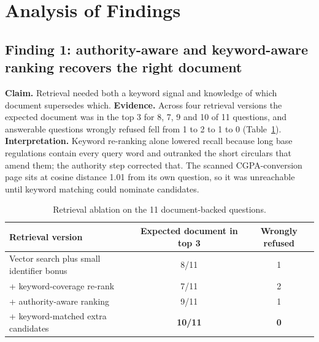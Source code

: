 \documentclass[10pt,a4paper]{article}
\begin{document}
\section{Analysis of Findings}\label{sec:analysis}
\subsection*{Finding 1: authority-aware and keyword-aware ranking recovers the right document}
\textbf{Claim.} Retrieval needed both a keyword signal and knowledge of which document supersedes which. \textbf{Evidence.} Across four retrieval versions the expected document was in the top 3 for 8, 7, 9 and 10 of 11 questions, and answerable questions wrongly refused fell from 1 to 2 to 1 to 0 (Table~\ref{tab:retr}). \textbf{Interpretation.} Keyword re-ranking alone lowered recall because long base regulations contain every query word and outranked the short circulars that amend them; the authority step corrected that. The scanned CGPA-conversion page sits at cosine distance 1.01 from its own question, so it was unreachable until keyword matching could nominate candidates.

\begin{table}[H]
\centering\small
\caption{Retrieval ablation on the 11 document-backed questions.}\label{tab:retr}
\begin{tabular}{@{}lcc@{}}
\toprule
\textbf{Retrieval version} & \textbf{Expected document in top 3} & \textbf{Wrongly refused}\\
\midrule
Vector search plus small identifier bonus & 8/11 & 1\\
+ keyword-coverage re-rank & 7/11 & 2\\
+ authority-aware ranking & 9/11 & 1\\
+ keyword-matched extra candidates & \textbf{10/11} & \textbf{0}\\
\bottomrule
\end{tabular}
\end{table}
\end{document}
